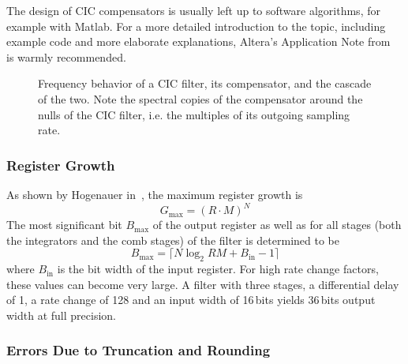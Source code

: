 The design of CIC compensators is  usually left up to software algorithms, for
example with Matlab. For a more  detailed introduction to the topic, including
example  code  and  more  elaborate explanations,  Altera's  Application  Note
from~\cite{altera:an455} is warmly recommended.

\begin{figure}
    \centering
    
    \caption[CIC Compensator]{%
        Frequency behavior of  a CIC filter, its compensator,  and the cascade
        of the  two. Note the  spectral copies of  the compensator  around the
        nulls of the  CIC filter, i.e. the multiples of  its outgoing sampling
        rate.%
    }
    \label{fig:cic:cfir}
\end{figure}
%
%
\subsubsection{Register Growth}
\label{subsubsec:cic:register_growth}

As shown by Hogenauer in~\cite{1163535}, the maximum register growth is
\begin{equation}
    \label{eq:cic:maximum_register_growth}
    G_\mathrm{max} = (R \cdot M)^N
\end{equation}
The most  significant bit $B_\mathrm{max}$ of  the output register as  well as
for all  stages (both the  integrators and the comb  stages) of the  filter is
determined to be
\begin{equation}
    \label{eq:cic:maximum_register_growth:bit_width}
    B_\mathrm{max} = \lceil N \log_2 RM + B_\mathrm{in} - 1 \rceil
\end{equation}
where $B_\mathrm{in}$ is  the bit width of the input  register.  For high rate
change  factors, these  values can  become very  large.  A  filter with  three
stages, a  differential delay of  \num{1}, a rate  change of \num{128}  and an
input  width of  \num{16}\,bits  yields  \num{36}\,bits output  width at  full
precision.
%
%
\subsubsection{Errors Due to Truncation and Rounding}
\label{subsubsec:cic:truncation_and_rounding}

